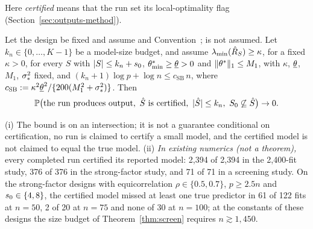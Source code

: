 Here \emph{certified} means that the run set its local-optimality flag (Section~\ref{sec:outputs-method}).

\begin{mainthm}\label{thm:screen}
Let the design be fixed and assume  and Convention~;  is not assumed. Let $k_n\in\{0,\dots,K-1\}$ be
a model-size budget, and assume $\lambda_{\min}(\hat R_S)\ge\kappa$, for a fixed $\kappa>0$, for every $S$ with $\lvert S\rvert\le
k_n+s_0$, $\theta^*_{\min}\ge\underline\theta>0$ and $\lVert \theta^*\rVert_1\le M_1$, with $\kappa$, $\underline\theta$, $M_1$, $\sigma_*^2$ fixed, and
$(k_n+1)\log p+\log n\le c_{\mathrm{SB}}\,n$, where $c_{\mathrm{SB}}:=\kappa^2\underline\theta^2/\{200(M_1^2+\sigma_*^2)\}$. Then
\[
  \P\big(\text{the run produces output},\ \Shat\text{ is certified},\ \abs{\Shat}\le k_n,\ \Sz\not\subseteq\Shat\big)\to0 .
\]
\end{mainthm}




\begin{mainrem}\label{rem:screen}
(i) The bound is on an intersection; it is not a guarantee conditional on certification, no run is claimed to certify a
small model, and the certified model is not claimed to equal the true model.
(ii) \emph{In existing numerics (not a theorem),} every completed run certified its reported model: 2,394 of 2,394 in the
2,400-fit study, 376 of 376 in the strong-factor study, and 71 of 71 in a screening study. On the strong-factor designs with
equicorrelation $\rho\in\{0.5,0.7\}$, $p\ge2.5n$ and $s_0\in\{4,8\}$, the certified model missed at least one true
predictor in 61 of 122 fits at $n=50$, 2 of 20 at $n=75$ and none of 30 at $n=100$; at the constants of these designs the
size budget of Theorem~\ref{thm:screen} requires $n\gtrsim1{,}450$.
\end{mainrem}


